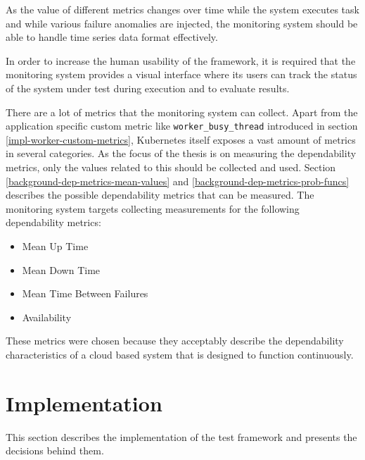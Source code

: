As the value of different metrics changes over time while the system executes task and while various failure anomalies are injected, the monitoring system should be able to handle time series data format effectively.

In order to increase the human usability of the framework, it is required that the monitoring system provides a visual interface where its users can track the status of the system under test during execution and to evaluate results.

There are a lot of metrics that the monitoring system can collect. Apart from the application specific custom metric like \texttt{worker\_busy\_thread} introduced in section \ref{impl-worker-custom-metrics}, Kubernetes itself exposes a vast amount of metrics in several categories. As the focus of the thesis is on measuring the dependability metrics, only the values related to this should be collected and used. Section \ref{background-dep-metrics-mean-values} and \ref{background-dep-metrics-prob-funcs} describes the possible dependability metrics that can be measured. The monitoring system targets collecting measurements for the following dependability metrics:

\begin{itemize}
	\item Mean Up Time
	\item Mean Down Time
	\item Mean Time Between Failures
	\item Availability
\end{itemize}

These metrics were chosen because they acceptably describe the dependability characteristics of a cloud based system that is designed to function continuously. 

\section{Implementation}


This section describes the implementation of the test framework and presents the decisions behind them.

